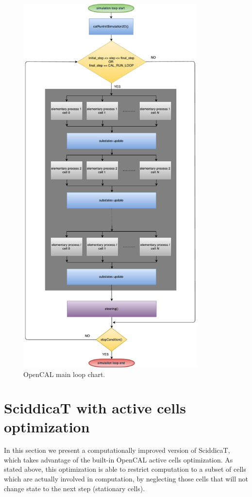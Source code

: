 \begin{figure}[htbp]
  \centering
  \includegraphics[width=9.5cm]{./images/OpenCAL/opencal_main_loop}
  \caption{OpenCAL main loop chart.}
  \label{fig:opencal_main_loop}
\end{figure}


\section{SciddicaT with active cells optimization}\label{sec:sciddicaT_active}
In this section we present a computationally improved version of SciddicaT, which
takes advantage of the built-in OpenCAL active cells optimization. As
stated above, this optimization is able to restrict computation to a
subset of cells which are actually involved in computation, by
neglecting those cells that will not change state to
the next step (stationary cells).

